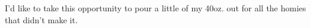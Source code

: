\begin{acknowledgements} 
I'd like to take this opportunity to pour a little of my 40oz. out for all
the homies that didn't make it.
\end{acknowledgements}

